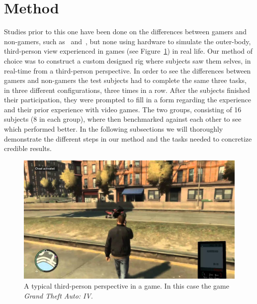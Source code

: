 \documentclass[runningheads,a4paper,oribibl]{llncs}
\begin{document}
\section{Method}
Studies prior to this one have been done on the differences between gamers and non-gamers, such as~\cite{schmierbach2011exploring} and~\cite{gong2015enhanced}, but none using hardware to simulate the outer-body, third-person view experienced in games (see Figure~\ref{fig:GTAIV}) in real life. Our method of choice was to construct a custom designed rig where subjects saw them selves, in real-time from a third-person perspective. In order to see the differences between gamers and non-gamers the test subjects had to complete the same three tasks, in three different configurations, three times in a row. After the subjects finished their participation, they were prompted to fill in a form regarding the experience and their prior experience with video games. The two groups, consisting of 16 subjects (8 in each group), where then benchmarked against each other to see which performed better. In the following subsections we will thoroughly demonstrate the different steps in our method and the tasks needed to concretize credible results.









\begin{figure}
   \centering
   \includegraphics[width=\textwidth]{ExternalMaterial/GTA}
   \caption{A typical third-person perspective in a game. In this case the game \emph{Grand Theft Auto: IV}. \label{fig:GTAIV}}
\end{figure}
\end{document}
